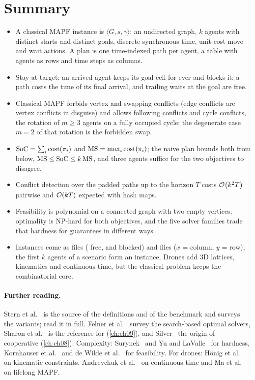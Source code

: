 \section{Summary}
\begin{summary}
\begin{itemize}
  \item A classical MAPF instance is $\langle G, s, \gamma\rangle$: an undirected graph, $k$ agents with distinct starts and distinct goals, discrete synchronous time, unit-cost move and wait actions. A plan is one time-indexed path per agent, a table with agents as rows and time steps as columns.
  \item Stay-at-target: an arrived agent keeps its goal cell for ever and blocks it; a path costs the time of its final arrival, and trailing waits at the goal are free.
  \item Classical MAPF forbids vertex and swapping conflicts (edge conflicts are vertex conflicts in disguise) and allows following conflicts and cycle conflicts, the rotation of $m \ge 3$ agents on a fully occupied cycle; the degenerate case $m = 2$ of that rotation is the forbidden swap.
  \item $\mathrm{SoC} = \sum_i \operatorname{cost}(\pi_i)$ and $\mathrm{MS} = \max_i \operatorname{cost}(\pi_i)$; the naive plan bounds both from below, $\mathrm{MS} \le \mathrm{SoC} \le k\,\mathrm{MS}$, and three agents suffice for the two objectives to disagree.
  \item Conflict detection over the padded paths up to the horizon $T$ costs $\mathcal{O}\!\left(k^2 T\right)$ pairwise and $\mathcal{O}\!\left(kT\right)$ expected with hash maps.
  \item Feasibility is polynomial on a connected graph with two empty vertices; optimality is NP-hard for both objectives, and the five solver families trade that hardness for guarantees in different ways.
  \item Instances come as  files ( free,  and  blocked) and  files ($x$ = column, $y$ = row); the first $k$ agents of a scenario form an instance. Drones add 3D lattices, kinematics and continuous time, but the classical problem keeps the combinatorial core.
\end{itemize}
\end{summary}

\paragraph{Further reading.}
Stern et al.~\cite{stern2019mapf} is the source of the definitions and of the
benchmark and surveys the variants; read it in full. Felner et
al.~\cite{felner2017search} survey the search-based optimal solvers, Sharon
et al.~\cite{sharon2015cbs} is the reference for \cbs (\cref{ch:ch09}), and
Silver~\cite{silver2005cooperative} the origin of cooperative \astar
(\cref{ch:ch08}). Complexity: Surynek~\cite{surynek2010optimization} and Yu
and LaValle~\cite{yu2013structure} for hardness, Kornhauser et
al.~\cite{kornhauser1984pebble} and de Wilde et al.~\cite{dewilde2014push}
for feasibility. For drones: H\"onig et
al.~\cite{honig2016mapf,honig2018trajectory} on kinematic constraints,
Andreychuk et al.~\cite{andreychuk2019ccbs} on continuous time and Ma et
al.~\cite{ma2017lifelong} on lifelong MAPF.

